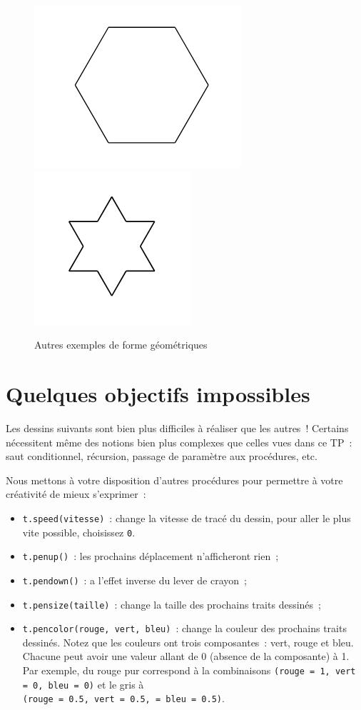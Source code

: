 \documentclass[11pt,a4paper]{article}
\begin{document}
\begin{figure}[H]
    \centering
    \includegraphics[height=0.4\textwidth]{img/hexagon}
    \includegraphics[height=0.4\textwidth]{img/star}
    \caption{Autres exemples de forme géométriques}
    \label{fig:ending_examples}
\end{figure}

\section{Quelques objectifs impossibles}

Les dessins suivants sont bien plus difficiles à réaliser que les autres~!
Certains nécessitent même des notions bien plus complexes que celles vues dans
ce TP~: saut conditionnel, récursion, passage de paramètre aux procédures, etc.

Nous mettons à votre disposition d'autres procédures pour permettre à
votre créativité de mieux s'exprimer~:

\begin{itemize}
    \item \lstinline{t.speed(vitesse)}~: change la vitesse de tracé du dessin, pour
        aller le plus vite possible, choisissez \lstinline{0}.
    \item \lstinline{t.penup()}~: les prochains déplacement n'afficheront rien~;
    \item \lstinline{t.pendown()}~: a l'effet inverse du lever de crayon~;
    \item \lstinline{t.pensize(taille)}~: change la taille des prochains traits
        dessinés~;
    \item \lstinline{t.pencolor(rouge, vert, bleu)}~: change la couleur des
        prochains traits dessinés. Notez que les couleurs ont trois
        composantes~: vert, rouge et bleu. Chacune peut avoir une valeur allant
        de 0 (absence de la composante) à 1. Par exemple, du rouge pur
        correspond à la combinaisons \lstinline{(rouge = 1, vert = 0, bleu = 0)}
        et le gris à \\ \lstinline{(rouge = 0.5, vert = 0.5, = bleu = 0.5)}.
\end{itemize}
\end{document}
